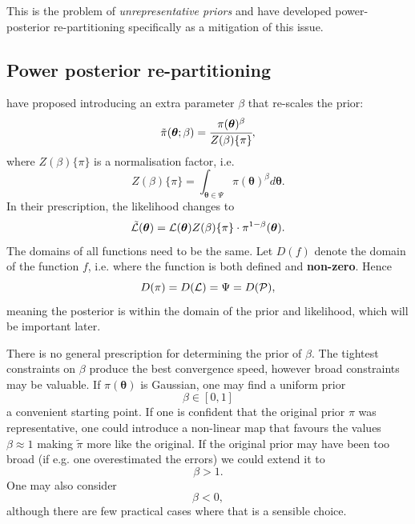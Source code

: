 \documentclass[usenatbib]{mnras}
\begin{document}
This is the problem of \emph{unrepresentative priors} and
\citeauthor*{chen-ferroz-hobson} have developed power-posterior
re-partitioning specifically as a mitigation of this issue. 

\subsection{Power posterior re-partitioning}
\label{sec:orgf27cff2}

\citeauthor{chen-ferroz-hobson} have proposed introducing an
extra parameter \(\beta\) that re-scales the prior:
\begin{equation*}
  \tilde{\pi}(\bm{\bm{\theta}};\beta) = \cfrac{\pi(\bm{\theta})^{\beta}}{Z(\beta)\{\pi\}},
\end{equation*}
where \(Z(\beta)\{\pi\}\) is a normalisation factor, i.e. 
\begin{equation*}
  Z(\beta)\{\pi\} = \int_{\bm{\theta} \in \Psi} \pi(\bm{\bm{\theta}})^{\beta}d\bm{\bm{\theta}}.
\end{equation*}
In their prescription, the likelihood changes to
\begin{equation*}
  \tilde{\cal L}(\bm{\theta}) = {\cal L}(\bm{\theta}) Z(\beta)\{\pi\} \cdot \pi^{1-\beta}(\bm{\theta}).
\end{equation*}
The domains of all functions need to be the same. Let
\(D(f)\) denote the domain of the function \(f\), i.e. where the
function is both defined and \textbf{non-zero}. Hence
\begin{equation*}
  D(\pi) = D({\cal L}) = \Psi = D({\cal P}),
\end{equation*} 
meaning the posterior is within the domain of the prior and
likelihood, which will be important later.\label{domain-discussion}

There is no general prescription for determining the prior of
\(\beta\). The tightest constraints on \(\beta\) produce the best
convergence speed, however broad constraints may be valuable.  If
\(\pi(\bm{\theta})\) is Gaussian, one may find a uniform prior
\[\beta\in[0,1]\] a convenient starting point.  If one is confident
that the original prior \(\pi\) was representative, one could
introduce a non-linear map that favours the values \(\beta\approx1\)
making \(\tilde{\pi}\) more like the original. If the original prior
may have been too broad (if e.g. one overestimated the errors) we
could extend it to \[\beta>1.\] One may also consider \[\beta<0,\]
although there are few practical cases where that is a sensible
choice.
\end{document}
